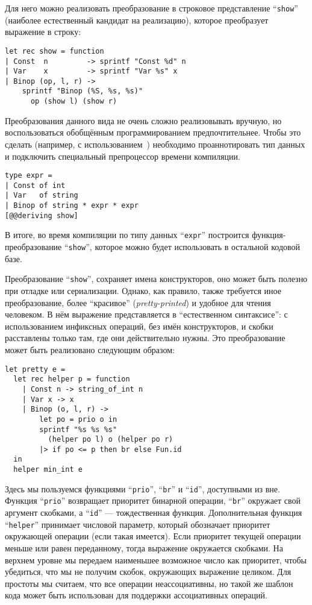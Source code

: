 Для него можно реализовать преобразование в строковое представление ``\lstinline{show}''
(наиболее естественный кандидат на реализацию),
которое преобразует выражение в строку: 

\begin{lstlisting}
let rec show = function
| Const  n         -> sprintf "Const %d" n
| Var    x         -> sprintf "Var %s" x
| Binop (op, l, r) ->
    sprintf "Binop (%S, %s, %s)" 
      op (show l) (show r)
\end{lstlisting}

Преобразования данного вида не очень сложно реализовывать вручную, но воспользоваться обобщённым программированием предпочтительнее. Чтобы это сделать (например, с использованием~\cite{ppxderiving})  необходимо проаннотировать тип данных и подключить специальный препроцессор времени компиляции. 

\begin{lstlisting}
type expr =
| Const of int
| Var   of string
| Binop of string * expr * expr
[@@deriving show]
\end{lstlisting}

\noindent В итоге, во время компиляции по типу данных ``\lstinline{expr}'' построится функция-преобразование ``\lstinline{show}'', которое можно будет использовать в остальной кодовой базе.

Преобразование 
``\lstinline{show}'',
сохраняет имена конструкторов, оно может быть
полезно при отладке или сериализации. Однако, как правило, также требуется иное преобразование, более ``красивое'' (\emph{pretty-printed}) и удобное для чтения человеком. 
В нём выражение представляется в ``естественном синтаксисе'': с использованием инфиксных операций, без имён конструкторов, и скобки расставлены только там, где они действительно нужны. Это преобразование может быть реализовано следующим образом:

\begin{lstlisting}
let pretty e =
  let rec helper p = function
    | Const n -> string_of_int n
    | Var x -> x
    | Binop (o, l, r) ->
        let po = prio o in
        sprintf "%s %s %s" 
          (helper po l) o (helper po r)
        |> if po <= p then br else Fun.id 
  in
  helper min_int e
\end{lstlisting}

\noindent Здесь мы пользуемся функциями ``\lstinline{prio}'', ``\lstinline{br}'' и ``\lstinline{id}'', доступными из вне. Функция ``\lstinline{prio}''
возвращает приоритет бинарной операции, ``\lstinline{br}'' окружает свой аргумент скобками, а ``\lstinline{id}'' --- тождественная функция.
Дополнительная функция ``\lstinline{helper}'' принимает числовой параметр, который обозначает приоритет окружающей операции (если такая имеется). Если приоритет текущей операции меньше или равен переданному, тогда выражение окружается скобками. На верхнем уровне мы передаем наименьшее возможное число как приоритет, чтобы убедиться, что мы не получим скобок, окружающих выражение целиком. Для простоты мы считаем, что все операции неассоциативны, но такой же шаблон кода может быть использован для поддержки ассоциативных операций.

